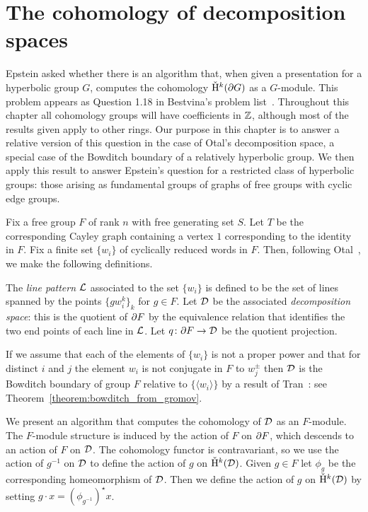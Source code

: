 \chapter{The cohomology of decomposition spaces}\label{chapter:decomposition_spaces}

Epstein asked whether there is an algorithm that, when given a presentation for a hyperbolic group $G$, computes the \vCech{} cohomology $\check{\mathrm{H}}{}^k(\partial G)$ as a $G$-module.
This problem appears as Question 1.18{} in Bestvina's problem list~\cite{bestvina}.
Throughout this chapter all \vCech{} cohomology groups will have coefficients in $\mathbb{Z}$, although most of the results given apply to other rings.
Our purpose in this chapter is to answer a relative version of this question in the case of Otal's decomposition space, a special case of the Bowditch boundary of a relatively hyperbolic group.
We then apply this result to answer Epstein's question for a restricted class of hyperbolic groups: those arising as fundamental groups of graphs of free groups with cyclic edge groups.

Fix a free group $F$ of rank $n$ with free generating set $S$.
Let $T$ be the corresponding Cayley graph containing a vertex $1$ corresponding to the identity in $F$.
Fix a finite set $\{w_i\}$ of cyclically reduced words in $F$.
Then, following Otal~\cite{otal92}, we make the following definitions.

\begin{definition}
  The \emph{line pattern $\mathcal{L}$} associated to the set $\{w_i\}$ is defined to be the set of lines spanned by the points\/ $\{gw_i^k\}_k$ for\/ $g \in F$.
  Let\/ $\mathcal{D}$ be the associated \emph{decomposition space}: this is the quotient of\/ $\partial F$ by the equivalence relation that identifies the two end points of each line in\/ $\mathcal{L}$.
  Let\/ $q \colon \partial F \to \mathcal{D}$ be the quotient projection.
\end{definition}

If we assume that each of the elements of $\{w_i\}$ is not a proper power and that for distinct $i$ and $j$ the element $w_i$ is not conjugate in $F$ to $w_j^{\pm}$ then $\mathcal{D}$ is the Bowditch boundary of group $F$ relative to $\{\langle w_i\rangle\}$ by a result of Tran~\cite{tran13}: see Theorem~\ref{theorem:bowditch_from_gromov}.

We present an algorithm that computes the \vCech{} cohomology of $\mathcal{D}$ as an $F$-module.
The $F$-module structure is induced by the action of $F$ on $\partial F$, which descends to an action of $F$ on $\mathcal{D}$.
The cohomology functor is contravariant, so we use the action of $g^{-1}$ on $\mathcal{D}$ to define the action of $g$ on $\check{\mathrm{H}}{}^k(\mathcal{D})$.
Given $g \in F$ let $\phi_g$ be the corresponding homeomorphism of $\mathcal{D}$.
Then we define the action of $g$ on $\check{\mathrm{H}}{}^k(\mathcal{D})$ by setting $g \cdot x = (\phi_{g^{-1}})^\star x$.

